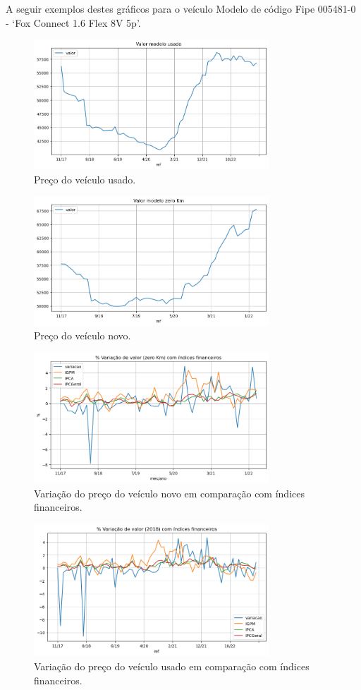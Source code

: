 \documentclass[conference]{IEEEtran}
\begin{document}
A seguir exemplos destes gráficos para o veículo Modelo de código Fipe 005481-0 - `Fox Connect 1.6 Flex 8V 5p'.

\begin{figure}[htbp]
	\centerline{\includegraphics[width=250pt]{assets/precoUsado.png}}
	\caption{Preço do veículo usado.}
	\label{fig3}
\end{figure}


\begin{figure}[htbp]
	\centerline{\includegraphics[width=250pt]{assets/precoZero.png}}
	\caption{Preço do veículo novo.}
	\label{fig4}
\end{figure}


\begin{figure}[htbp]
	\centerline{\includegraphics[width=250pt]{assets/varZero.png}}
	\caption{Variação do preço do veículo novo em comparação com índices financeiros.}
	\label{fig5}
\end{figure}


\begin{figure}[htbp]
	\centerline{\includegraphics[width=250pt]{assets/varUsado.png}}
	\caption{Variação do preço do veículo usado em comparação com índices financeiros.}
	\label{fig6}
\end{figure}
\end{document}
